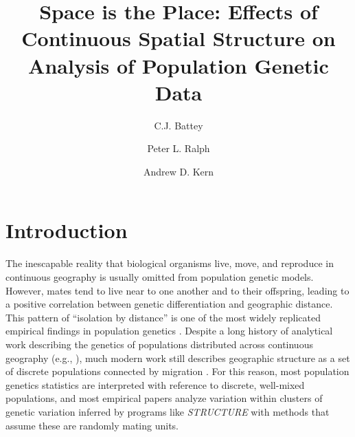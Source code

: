 \documentclass[10pt,twoside,lineno,hidelinks]{preprint}
\title{Space is the Place: Effects of Continuous Spatial Structure on Analysis of Population Genetic Data}
\author[$\ast$,1]{C.J. Battey}
\author[$\ast, \dagger$]{Peter L. Ralph}
\author[$\ast, \dagger$]{Andrew D. Kern}
\affil[$\ast$]{University of Oregon Dept. Biology, Institute for Ecology Evolution}
\begin{document}
\maketitle
\thispagestyle{firststyle}
\firstpagefootnote


\vspace{-35pt}%

\section{Introduction}

The inescapable reality that biological organisms live, move, and reproduce in continuous geography is usually omitted from population genetic models. However, mates tend to live near to one another and to their offspring, leading to a positive correlation between genetic differentiation and geographic distance. This pattern of ``isolation by distance'' \citep{Wright1943} is one of the most widely replicated empirical findings in population genetics \citep{Chen2017,Jay2012,Sharbel2000}. Despite a long history of analytical work describing the genetics of populations distributed across continuous geography (e.g., \citet{Wright1943,Rousset1997,barton2002neutral,Barton2010,Ringbauer2017,robledoarnuncio2010isolation}), much modern work still describes geographic structure as a set of discrete populations connected by migration \citep[e.g.,][]{Wright1931,epperson2003geographical,rousset2011likelihoodbased,Shirk2014,lundgren2018populations}. For this reason, most population genetics statistics are interpreted with reference to discrete, well-mixed populations, and most empirical papers analyze variation within clusters of genetic variation inferred by programs like \textit{STRUCTURE} \citep{Pritchard2000} with methods that assume these are randomly mating units.
\end{document}
